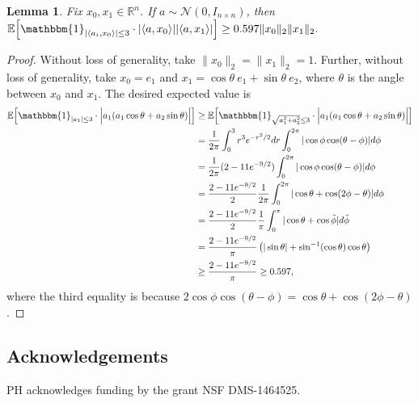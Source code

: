 \documentclass[12pt]{article}
\newcommand{\1}{\mathbbm{1}}
\newcommand{\xo}{x_0}
\newcommand{\inddef}{\mathbbm{1}_{|\langle a_i, \xo \rangle| \leq 3}}
\newcommand{\xtilde}{\tilde{x}}
\newcommand{\etilde}{\tilde{e}}
\newtheorem{lemma}[theorem]{Lemma}
\begin{document}
\begin{lemma}  \label{lemma:expectation-aiaixx}
Fix $x_0, x_1 \in \mathbb{R}^n$.  If $a \sim \mathcal{N}(0, I_{n \times n})$, then 
$\mathbb{E} \Bigl[ \inddef \cdot |\langle a, x_0\rangle| | \langle a, x_1 \rangle |  \Bigr]  \geq 0.597 \|x_0\|_2 \|x_1\|_2.$
\end{lemma}
\begin{proof}
Without loss of generality, take $\|x_0\|_2=\|x_1\|_2 = 1$.  Further, without loss of generality, take $x_0 = e_1$ and $x_1 = \cos \theta \ e_1 + \sin \theta \ e_2$, where $\theta$ is the angle between $\xo$ and $x_1$.  The desired expected value is 
\begin{align*}
\mathbb{E} \Bigl[ \mathbbm{1}_{|a_1| \leq 3} \cdot  \Big |a_1 (a_1 \cos \theta + a_2 \sin \theta) \Big | \Bigr]  
&\geq \mathbb{E} \Bigl[ \mathbbm{1}_{\sqrt{a_1^2 +a_2^2}  \leq 3} \cdot \Big|a_1 (a_1 \cos \theta + a_2 \sin \theta) \Big | \Bigr]  \\
&= \frac{1}{2 \pi} \int_0^3 r^3 e^{-r^2/2} dr \int_0^{2\pi} |\cos \phi \cos(\theta - \phi)| d\phi \\
&= \frac{1}{2 \pi} (2 - 11 e^{-9/2}) \int_0^{2\pi} |\cos \phi \cos(\theta - \phi)| d\phi \\
&=\frac{2 - 11 e^{-9/2}} {2 }\frac{1}{2\pi} \int_0^{2\pi}|\cos \theta + \cos(2 \phi - \theta)| d\phi\\
&=\frac{2 - 11 e^{-9/2}} {2 }\frac{1}{\pi} \int_0^\pi |\cos \theta + \cos \tilde{\phi}| d\tilde{\phi}\\
&=\frac{2 - 11 e^{-9/2}} {\pi }  \left(|\sin \theta| + \sin^{-1} (\cos \theta) \cos \theta \right)\\
&\geq \frac{2 - 11 e^{-9/2}} {\pi } \geq 0.597,
\end{align*}
where the third equality is because $2 \cos \phi \cos(\theta - \phi) = \cos \theta + \cos(2 \phi - \theta)$. 
\end{proof}

%




\subsection*{Acknowledgements}
PH acknowledges funding by the grant NSF DMS-1464525. 


\end{document}
